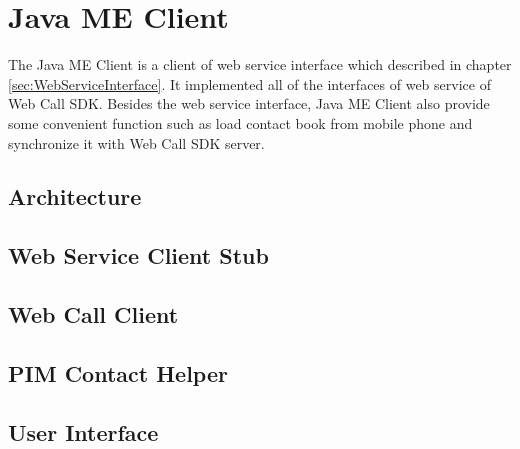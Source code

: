 
\chapter{Java ME Client}
\label{sec:JavaMEClient}

The Java ME Client is a client of web service interface which described in chapter \ref{sec:WebServiceInterface}. It implemented all of the interfaces of web service of Web Call SDK. Besides the web service interface, Java ME Client also provide some convenient function such as load contact book from mobile phone and synchronize it with Web Call SDK server. 

\section{Architecture}
\label{sec:JavaMEClient:Architecture}


\section{Web Service Client Stub}
\label{sec:JavaMEClient:WebServiceClientStub}

\section{Web Call Client}
\label{sec:JavaMEClient:WebCallClient}

\section{PIM Contact Helper}
\label{sec:JavaMEClient:PIMContactHelper}

\section{User Interface}
\label{sec:JavaMEClient:UserInterface}





